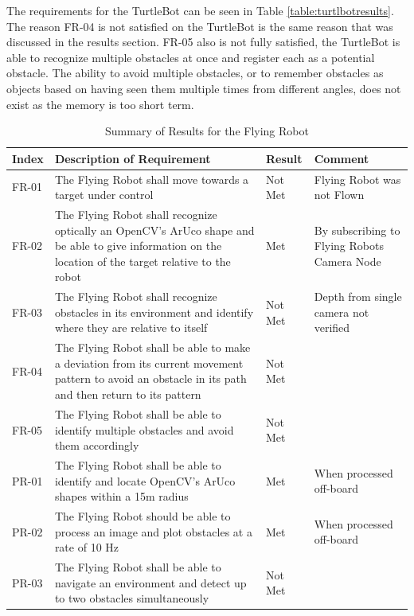 \documentclass{article}[12]
\begin{document}
 The requirements for the TurtleBot can be seen in Table \ref{table:turtlbotresults}. The reason FR-04 is not satisfied on the TurtleBot is the same reason that was discussed in the results section. FR-05 also is not fully satisfied, the TurtleBot is able to recognize multiple obstacles at once and register each as a potential obstacle. The ability to avoid multiple obstacles, or to remember obstacles as objects based on having seen them multiple times from different angles, does not exist as the memory is too short term.

	\begin{table}[H]
  \small
		\begin{tabular}{p{2cm} p{8cm} p{2cm} p{3cm}}
			\hline
			{\textbf{Index}} & {\textbf{Description of Requirement}} & {\textbf{Result}} & {\textbf{Comment}} \\ \hline
FR-01 & The Flying Robot shall move towards a target under control & Not Met & Flying Robot was not Flown \\
FR-02 & The Flying Robot shall recognize optically an OpenCV's ArUco shape and be able to give information on the location of the target relative to the robot & Met & By subscribing to Flying Robots Camera Node\\
FR-03 & The Flying Robot shall recognize obstacles in its environment and identify where they are relative to itself & Not Met & Depth from single camera not verified\\
FR-04 & The Flying Robot shall be able to make a deviation from its current movement pattern to avoid an obstacle in its path and then return to its pattern & Not Met &  \\
FR-05 & The Flying Robot shall be able to identify multiple obstacles and avoid them accordingly & Not Met  &\\
PR-01 & The Flying Robot shall be able to identify and locate OpenCV's ArUco shapes within a 15m radius & Met & When processed off-board\\
PR-02 & The Flying Robot should be able to process an image and plot obstacles at a rate of 10 Hz & Met & When processed off-board \\
PR-03 & The Flying Robot shall be able to navigate an environment and detect up to two obstacles simultaneously & Not Met & \\ \hline
		\end{tabular}
		\caption{Summary of Results for the Flying Robot}
		\label{table:uavresults}
 \end{table}
\end{document}
